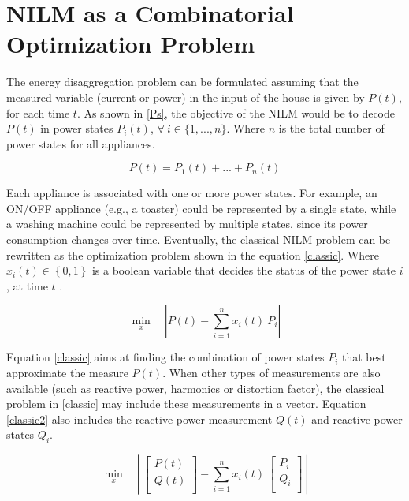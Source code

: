 

\section{NILM as a Combinatorial Optimization Problem}

The energy disaggregation problem can be formulated assuming that the measured variable (current or power) in the input of the house is given by $P(t)$, for each time $t$. As shown in \eqref{Ps}, the objective of the NILM would be to decode $P(t)$ in power states $P_i(t)$, $\forall \ i \in \{1,...,n\}$. Where $n$ is the total number of power states for all appliances. 

\begin{equation} \label{Ps}
    P(t) = P_1(t) + ... + P_n(t)
\end{equation}
 
Each appliance is associated with one or more power states. For example, an ON/OFF appliance (e.g., a toaster) could be represented by a single state, while a washing machine could be represented by multiple states, since its power consumption changes over time. 
Eventually, the classical NILM problem can be rewritten as the optimization problem shown in the equation \eqref{classic}. Where $x_i(t) \in \left\{ 0 , 1 \right\}$ is a boolean variable that decides the status of the power state $i$, at time $t$ \cite{hart}.

\begin{equation} \label{classic}
    \min_{x} \quad \left| P(t) - \sum_{i=1}^{n} x_i(t)\ P_i \right |
\end{equation}

Equation \eqref{classic} aims at finding the combination of power states $P_i$ that best approximate the measure $P(t)$. When other types of measurements are also available (such as reactive power, harmonics or distortion factor), the classical problem in \eqref{classic} may include these measurements in a vector. Equation \eqref{classic2} also includes the reactive power measurement $Q(t)$ and reactive power states $Q_i$. 

\begin{equation} \label{classic2}
    \min_{x} \quad \left|\ \begin{bmatrix}
         P(t) \\
         Q(t) \\
        \end{bmatrix} - \sum_{i=1}^{n} x_i(t)\ \begin{bmatrix}
         P_i \\
         Q_i \\
        \end{bmatrix} \ \right|
\end{equation}

